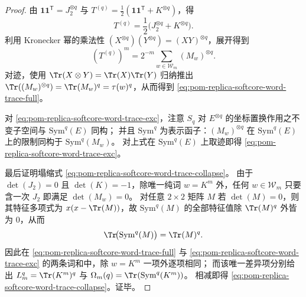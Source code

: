 \begin{proof}
由 \(\mathbf{1}\mathbf{1}^{\mathsf T}=J_2^{\otimes q}\) 与 \(T^{(q)}=\tfrac12(\mathbf{1}\mathbf{1}^{\mathsf T}+K^{\otimes q})\)，得
\[
T^{(q)}=\frac12\bigl(J_2^{\otimes q}+K^{\otimes q}\bigr).
\]
利用 Kronecker 幂的乘法性 \((X^{\otimes q})(Y^{\otimes q})=(XY)^{\otimes q}\)，展开得到
\[
(T^{(q)})^m
=2^{-m}\sum_{w\in\mathcal{W}_m}(M_w)^{\otimes q}.
\]
对迹，使用 \(\Tr(X\otimes Y)=\Tr(X)\Tr(Y)\) 归纳推出
\(\Tr((M_w)^{\otimes q})=\Tr(M_w)^q=\tau(w)^q\)，从而得到 \eqref{eq:pom-replica-softcore-word-trace-full}。
\par
对 \eqref{eq:pom-replica-softcore-word-trace-exc}，注意 \(S_q\) 对 \(E^{\otimes q}\) 的坐标置换作用之不变子空间与 \(\mathrm{Sym}^q(E)\) 同构；
并且 \(\mathrm{Sym}^q\) 为表示函子：\((M_w)^{\otimes q}\) 在 \(\mathrm{Sym}^q(E)\) 上的限制同构于 \(\mathrm{Sym}^q(M_w)\)。
对上式在 \(\mathrm{Sym}^q(E)\) 上取迹即得 \eqref{eq:pom-replica-softcore-word-trace-exc}。
\par
最后证明塌缩式 \eqref{eq:pom-replica-softcore-word-trace-collapse}。
由于 \(\det(J_2)=0\) 且 \(\det(K)=-1\)，除唯一纯词 \(w=K^m\) 外，任何 \(w\in\mathcal{W}_m\) 只要含一次 \(J_2\) 即满足 \(\det(M_w)=0\)。
对任意 \(2\times 2\) 矩阵 \(M\) 若 \(\det(M)=0\)，则其特征多项式为 \(x(x-\Tr(M))\)，故 \(\mathrm{Sym}^q(M)\) 的全部特征值除 \(\Tr(M)^q\) 外皆为 \(0\)，从而
\[
\Tr\!\bigl(\mathrm{Sym}^q(M)\bigr)=\Tr(M)^q.
\]
因此在 \eqref{eq:pom-replica-softcore-word-trace-full} 与 \eqref{eq:pom-replica-softcore-word-trace-exc} 的两条词和中，除 \(w=K^m\) 一项外逐项相同；
而该唯一差异项分别给出 \(L_m^q=\Tr(K^m)^q\) 与 \(\Omega_m(q)=\Tr(\mathrm{Sym}^q(K^m))\)。
相减即得 \eqref{eq:pom-replica-softcore-word-trace-collapse}。证毕。
\end{proof}

